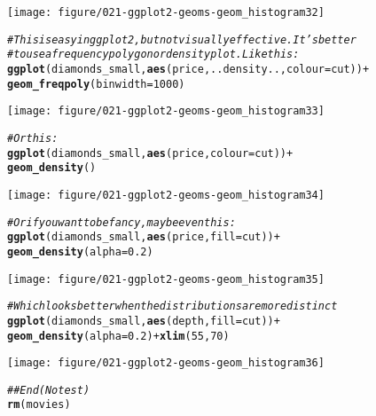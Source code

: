 \documentclass[a4paper,titlepage]{tufte-handout}\usepackage[]{graphicx}\usepackage[]{color}
\makeatletter
\def\maxwidth{ %
  \ifdim\Gin@nat@width>\linewidth
    \linewidth
  \else
    \Gin@nat@width
  \fi
}
\newcommand{\hlnum}[1]{\textcolor[rgb]{0.686,0.059,0.569}{#1}}%
\newcommand{\hlcom}[1]{\textcolor[rgb]{0.678,0.584,0.686}{\textit{#1}}}%
\newcommand{\hlopt}[1]{\textcolor[rgb]{0,0,0}{#1}}%
\newcommand{\hlstd}[1]{\textcolor[rgb]{0.345,0.345,0.345}{#1}}%
\newcommand{\hlkwc}[1]{\textcolor[rgb]{0.333,0.667,0.333}{#1}}%
\newcommand{\hlkwd}[1]{\textcolor[rgb]{0.737,0.353,0.396}{\textbf{#1}}}%
\newenvironment{kframe}{%
 \def\at@end@of@kframe{}%
 \ifinner\ifhmode%
  \def\at@end@of@kframe{\end{minipage}}%
  \begin{minipage}{\columnwidth}%
 \fi\fi%
 \def\FrameCommand##1{\hskip\@totalleftmargin \hskip-\fboxsep
 \colorbox{shadecolor}{##1}\hskip-\fboxsep
     \hskip-\linewidth \hskip-\@totalleftmargin \hskip\columnwidth}%
 \MakeFramed {\advance\hsize-\width
   \@totalleftmargin\z@ \linewidth\hsize
   \@setminipage}}%
 {\par\unskip\endMakeFramed%
 \at@end@of@kframe}
\newenvironment{knitrout}{}{} %
\makeatother
\begin{document}
\begin{knitrout}
\begin{kframe}
{\ttfamily\noindent\itshape\color{messagecolor}{\#\# stat\_bin: binwidth defaulted to range/30. Use 'binwidth = x' to adjust this.}}\end{kframe}
\texttt{[image: figure/021-ggplot2-geoms-geom\_histogram32]} 
\begin{kframe}\begin{alltt}
\hlcom{# This is easy in ggplot2, but not visually effective.  It's better}
\hlcom{# to use a frequency polygon or density plot.  Like this:}
\hlkwd{ggplot}\hlstd{(diamonds_small,} \hlkwd{aes}\hlstd{(price, ..density..,} \hlkwc{colour} \hlstd{= cut))} \hlopt{+}
  \hlkwd{geom_freqpoly}\hlstd{(}\hlkwc{binwidth} \hlstd{=} \hlnum{1000}\hlstd{)}
\end{alltt}
\end{kframe}
\texttt{[image: figure/021-ggplot2-geoms-geom\_histogram33]} 
\begin{kframe}\begin{alltt}
\hlcom{# Or this:}
\hlkwd{ggplot}\hlstd{(diamonds_small,} \hlkwd{aes}\hlstd{(price,} \hlkwc{colour} \hlstd{= cut))} \hlopt{+}
  \hlkwd{geom_density}\hlstd{()}
\end{alltt}
\end{kframe}
\texttt{[image: figure/021-ggplot2-geoms-geom\_histogram34]} 
\begin{kframe}\begin{alltt}
\hlcom{# Or if you want to be fancy, maybe even this:}
\hlkwd{ggplot}\hlstd{(diamonds_small,} \hlkwd{aes}\hlstd{(price,} \hlkwc{fill} \hlstd{= cut))} \hlopt{+}
  \hlkwd{geom_density}\hlstd{(}\hlkwc{alpha} \hlstd{=} \hlnum{0.2}\hlstd{)}
\end{alltt}
\end{kframe}
\texttt{[image: figure/021-ggplot2-geoms-geom\_histogram35]} 
\begin{kframe}\begin{alltt}
\hlcom{# Which looks better when the distributions are more distinct}
\hlkwd{ggplot}\hlstd{(diamonds_small,} \hlkwd{aes}\hlstd{(depth,} \hlkwc{fill} \hlstd{= cut))} \hlopt{+}
  \hlkwd{geom_density}\hlstd{(}\hlkwc{alpha} \hlstd{=} \hlnum{0.2}\hlstd{)} \hlopt{+} \hlkwd{xlim}\hlstd{(}\hlnum{55}\hlstd{,} \hlnum{70}\hlstd{)}
\end{alltt}


{\ttfamily\noindent\color{warningcolor}{\#\# Warning: Removed 2 rows containing non-finite values (stat\_density).}}\end{kframe}
\texttt{[image: figure/021-ggplot2-geoms-geom\_histogram36]} 
\begin{kframe}\begin{alltt}
\hlcom{## End(No test)}
\hlkwd{rm}\hlstd{(movies)}
\end{alltt}
\end{kframe}
\end{knitrout}
\end{document}
